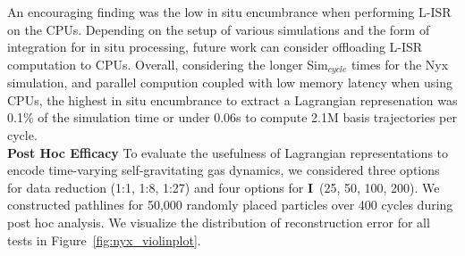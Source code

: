 An encouraging finding was the low in situ encumbrance when performing L-ISR on the CPUs.
%
Depending on the setup of various simulations and the form of integration for in situ processing, future work can consider offloading L-ISR computation to CPUs.
%
Overall, considering the longer Sim$_{cycle}$ times for the Nyx simulation, and parallel compution coupled with low memory latency when using CPUs, the highest in situ encumbrance to extract a Lagrangian represenation was 0.1\% of the simulation time or under 0.06s to compute 2.1M basis trajectories per cycle.\\




\noindent\textbf{Post Hoc Efficacy}
To evaluate the usefulness of Lagrangian representations to encode time-varying self-gravitating gas dynamics, we considered three options for data reduction (1:1, 1:8, 1:27) and four options for \textbf{I}~(25, 50, 100, 200).
%
We constructed pathlines for 50,000 randomly placed particles over 400 cycles during post hoc analysis.
%
%
%
We visualize the distribution of reconstruction error for all tests in Figure~\ref{fig:nyx_violinplot}.
%


